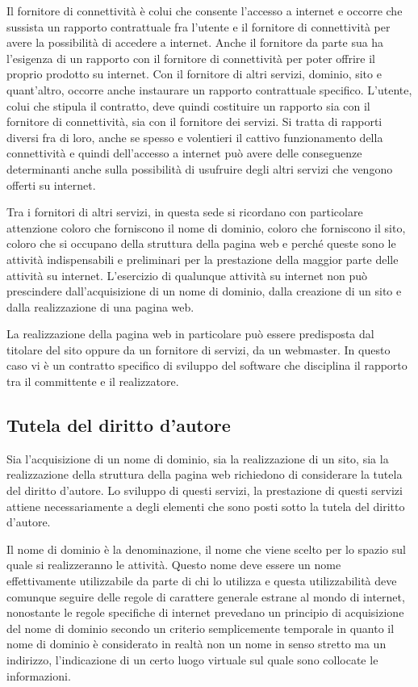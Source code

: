  Il fornitore di connettività è colui che consente l'accesso a internet e occorre che sussista un rapporto contrattuale fra l'utente e il fornitore di connettività per avere la possibilità di accedere a internet. Anche il fornitore da parte sua ha l'esigenza di un rapporto con il fornitore di connettività per poter offrire il proprio prodotto su internet. Con il fornitore di altri servizi, dominio, sito e quant'altro, occorre anche instaurare un rapporto contrattuale specifico. L'utente, colui che stipula il contratto, deve quindi costituire un rapporto sia con il fornitore di connettività, sia con il fornitore dei servizi. Si tratta di rapporti diversi fra di loro, anche se spesso e volentieri il cattivo funzionamento della connettività e quindi dell'accesso a internet può avere delle conseguenze determinanti anche sulla possibilità di usufruire degli altri servizi che vengono offerti su internet. 
 
 Tra i fornitori di altri servizi, in questa sede si ricordano con particolare attenzione coloro che forniscono il nome di dominio, coloro che forniscono il sito, coloro che si occupano della struttura della pagina web e perché queste sono le attività indispensabili e preliminari per la prestazione della maggior parte delle attività su internet. L'esercizio di qualunque attività su internet non può prescindere dall'acquisizione di un nome di dominio, dalla creazione di un sito e dalla realizzazione di una pagina web. 
 
 La realizzazione della pagina web in particolare può essere predisposta dal titolare del sito oppure da un fornitore di servizi, da un webmaster. In questo caso vi è un contratto specifico di sviluppo del software che disciplina il rapporto tra il committente e il realizzatore. 
 
 \subsection{Tutela del diritto d'autore}
 Sia l'acquisizione di un nome di dominio, sia la realizzazione di un sito, sia la realizzazione della struttura della pagina web richiedono di considerare la tutela del diritto d'autore. Lo sviluppo di questi servizi, la prestazione di questi servizi attiene necessariamente a degli elementi che sono posti sotto la tutela del diritto d'autore. 
 
 Il nome di dominio è la denominazione, il nome che viene scelto per lo spazio sul quale si realizzeranno le attività. Questo nome deve essere un nome effettivamente utilizzabile da parte di chi lo utilizza e questa utilizzabilità deve comunque seguire delle regole di carattere generale estrane al mondo di internet, nonostante le regole specifiche di internet prevedano un principio di acquisizione del nome di dominio secondo un criterio semplicemente temporale in quanto il nome di dominio è considerato in realtà non un nome in senso stretto ma un indirizzo, l'indicazione di un certo luogo virtuale sul quale sono collocate le informazioni. 
 
